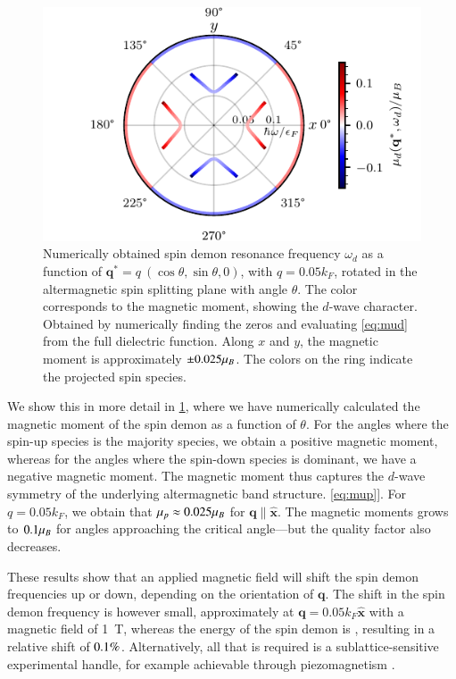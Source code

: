 \documentclass[aps,prl,reprint,twocolumns,superscriptaddress]{revtex4-2}
\newcommand{\xx}{\hat{\bm{x}}}
\newcommand{\kF}{k_{F}}
\begin{document}
	\begin{figure}
		\centering
		\includegraphics[width=\columnwidth]{polar-plot-sign}
		\caption{Numerically obtained spin demon resonance frequency $\omega_d$ as a function of $\bm q^*=q\ (\cos\theta, \sin\theta,0)$, with $q=0.05\kF$, rotated in the altermagnetic spin splitting plane with angle $\theta$. The color corresponds to the magnetic moment, showing the $d$-wave character. Obtained by numerically finding the zeros and evaluating \cref{eq:mud} from the full dielectric function.
			Along $x$ and $y$, the magnetic moment is approximately $\pm0.025\mu_B$. The colors on the ring indicate the projected spin species. \label{fig:magnetic-moment} }
	\end{figure}
	
	We show this in more detail in \cref{fig:magnetic-moment}, where we have numerically calculated the magnetic moment of the spin demon as a function of $\theta$. For the angles where the spin-up species is the majority species, we obtain a positive magnetic moment, whereas for the angles where the spin-down species is dominant, we have a negative magnetic moment. The magnetic moment thus captures the $d$-wave symmetry of the underlying altermagnetic band structure.
\cref{eq:mup}]. For $q=0.05\kF$, we obtain that $\mu_p\approx0.025\mu_B$ for $\bm q\parallel \xx$. The magnetic moments grows to $0.1\mu_B$ for angles approaching the critical angle---but the quality factor also decreases. 
	
	These results show that an applied magnetic field will shift the spin demon frequencies up or down, depending on the orientation of $\bm q$. The shift in the spin demon frequency is however small, approximately \muBShift at $\bm q=0.05k_F\hat{\bm x}$ with a magnetic field of \SI{1}{T}, whereas the energy of the spin demon is \demonenergy, resulting in a relative shift of $0.1\%$. Alternatively, all that is required is a sublattice-sensitive experimental handle, for example achievable through piezomagnetism \cite{aoyamaPiezomagneticPropertiesAltermagnetic2024}.
	
\end{document}
